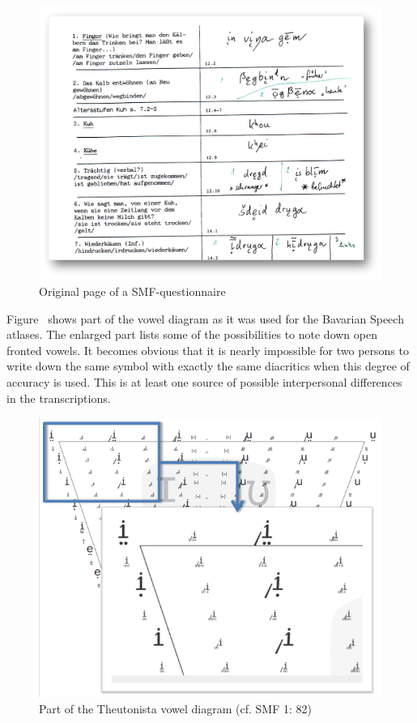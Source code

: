 \documentclass[output=paper]{LSP/langsci}
\begin{document}
\begin{figure}
\includegraphics[width=\textwidth]{illustrations/mathus_fig3}
\caption{Original page of a SMF-questionnaire}
\label{fig:3}
\end{figure}

Figure~ shows part of the vowel diagram as it was used for the Bavarian Speech atlases. The enlarged part lists some of the possibilities to note down open fronted vowels. It becomes obvious that it is nearly impossible for two persons to write down the same symbol with exactly the same diacritics when this degree of accuracy is used. This is at least one source of possible interpersonal differences in the transcriptions.

\begin{figure}
\includegraphics[width=\textwidth]{illustrations/mathus_fig4}
\caption{Part of the Theutonista vowel diagram (cf. SMF 1: 82)}
\label{fig:4}
\end{figure}
\end{document}
